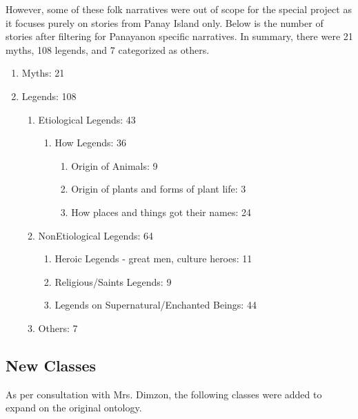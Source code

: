 However, some of these folk narratives were out of scope for the special project as it focuses purely on stories from Panay Island only. Below is the number of stories after filtering for Panayanon specific narratives. In summary, there were 21 myths, 108 legends, and 7 categorized as others.

\begin{enumerate}[label=\Roman*.]
\item Myths: 21
    \item Legends: 108
    \begin{enumerate} [label=\Alph*.]
        \item Etiological Legends: 43
        \begin{enumerate}[label=\roman*.]
            \item How Legends: 36
            \begin{enumerate}[label=\alph*.]
                \item Origin of Animals: 9
                \item Origin of plants and forms of plant life: 3
                \item How places and things got their names: 24
            \end{enumerate}
        \end{enumerate}
        \item NonEtiological Legends: 64
            \begin{enumerate}[label=\roman*.]
                \item Heroic Legends - great men, culture heroes: 11
                \item Religious/Saints Legends: 9
                \item Legends on Supernatural/Enchanted Beings: 44
            \end{enumerate}
        \item Others: 7
    \end{enumerate}
\end{enumerate}

\subsection{New Classes}
    As per consultation with Mrs. Dimzon, the following classes were added to expand on the original ontology.

